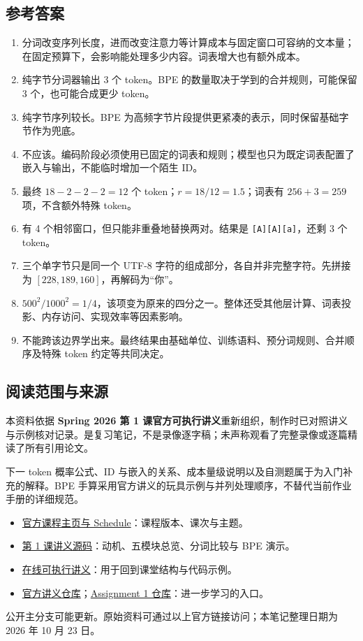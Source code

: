 \documentclass[UTF8,fontset=fandol,zihao=-4,a4paper]{ctexart}
\newcommand{\tok}[1]{\texttt{#1}}
\begin{document}
\subsection{参考答案}
\begin{enumerate}[label=\textbf{A\arabic*.},itemsep=0.45em]
\item 分词改变序列长度，进而改变注意力等计算成本与固定窗口可容纳的文本量；在固定预算下，会影响能处理多少内容。词表增大也有额外成本。
\item 纯字节分词器输出 3 个 token。BPE 的数量取决于学到的合并规则，可能保留 3 个，也可能合成更少 token。
\item 纯字节序列较长。BPE 为高频字节片段提供更紧凑的表示，同时保留基础字节作为兜底。
\item 不应该。编码阶段必须使用已固定的词表和规则；模型也只为既定词表配置了嵌入与输出，不能临时增加一个陌生 ID。
\item 最终 $18-2-2-2=12$ 个 token；$r=18/12=1.5$；词表有 $256+3=259$ 项，不含额外特殊 token。
\item 有 4 个相邻窗口，但只能非重叠地替换两对。结果是 \tok{[A][A][a]}，还剩 3 个 token。
\item 三个单字节只是同一个 UTF-8 字符的组成部分，各自并非完整字符。先拼接为 $[228,189,160]$，再解码为“你”。
\item $500^2/1000^2=1/4$，该项变为原来的四分之一。整体还受其他层计算、词表投影、内存访问、实现效率等因素影响。
\item 不能跨该边界学出来。最终结果由基础单位、训练语料、预分词规则、合并顺序及特殊 token 约定等共同决定。
\end{enumerate}

\subsection{阅读范围与来源}
\small
本资料依据 \textbf{Spring 2026 第 1 课官方可执行讲义}重新组织，制作时已对照讲义与示例核对记录。是复习笔记，不是录像逐字稿；未声称观看了完整录像或逐篇精读了所有引用论文。

下一 token 概率公式、ID 与嵌入的关系、成本量级说明以及自测题属于为入门补充的解释。BPE 手算采用官方讲义的玩具示例与并列处理顺序，不替代当前作业手册的详细规范。

\begin{itemize}[itemsep=0.2em]
\item \href{https://cs336.stanford.edu/}{官方课程主页与 Schedule}：课程版本、课次与主题。
\item \href{https://github.com/stanford-cs336/lectures/blob/main/lecture_01.py}{第 1 课讲义源码}：动机、五模块总览、分词比较与 BPE 演示。
\item \href{https://cs336.stanford.edu/lectures/?trace=lecture_01}{在线可执行讲义}：用于回到课堂结构与代码示例。
\item \href{https://github.com/stanford-cs336/lectures}{官方讲义仓库}；\href{https://github.com/stanford-cs336/assignment1-basics}{Assignment 1 仓库}：进一步学习的入口。
\end{itemize}
公开主分支可能更新。原始资料可通过以上官方链接访问；本笔记整理日期为 2026 年 10 月 23 日。
\normalsize
\end{document}
